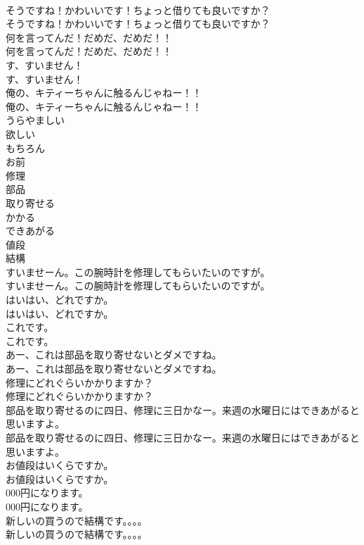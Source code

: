 \documentclass[8pt]{extreport}
\begin{document}
\begin{CJK}{UTF8}{min}
\\	そうですね！かわいいです！ちょっと借りても良いですか？	
\\	そうですね！かわいいです！ちょっと借りても良いですか？ 
\\	何を言ってんだ！だめだ、だめだ！！	
\\	何を言ってんだ！だめだ、だめだ！！ 
\\	す、すいません！	
\\	す、すいません！ 
\\	俺の、キティーちゃんに触るんじゃねー！！	
\\	俺の、キティーちゃんに触るんじゃねー！！ 
\\	うらやましい
\\	欲しい
\\	もちろん
\\	お前
\\	修理
\\	部品
\\	取り寄せる
\\	かかる
\\	できあがる
\\	値段
\\	結構
\\	すいませーん。この腕時計を修理してもらいたいのですが。	
\\	すいませーん。この腕時計を修理してもらいたいのですが。 
\\	はいはい、どれですか。	
\\	はいはい、どれですか。 
\\	これです。	
\\	これです。 
\\	あー、これは部品を取り寄せないとダメですね。	
\\	あー、これは部品を取り寄せないとダメですね。 
\\	修理にどれぐらいかかりますか？	
\\	修理にどれぐらいかかりますか？ 
\\	部品を取り寄せるのに四日、修理に三日かなー。来週の水曜日にはできあがると思いますよ。	
\\	部品を取り寄せるのに四日、修理に三日かなー。来週の水曜日にはできあがると思いますよ。 
\\	お値段はいくらですか。	
\\	お値段はいくらですか。 
\\	000円になります。	
\\	000円になります。 
\\	新しいの買うので結構です。。。。	
\\	新しいの買うので結構です。。。。 

\end{CJK}
\end{document}
